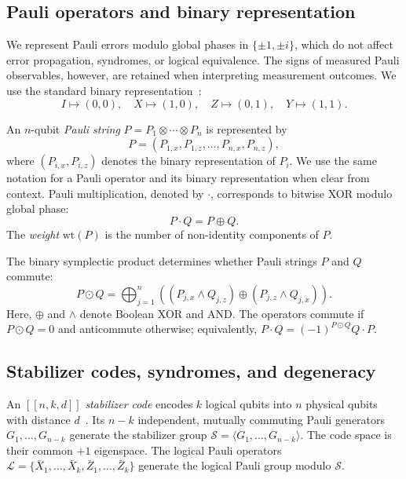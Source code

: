 \documentclass[acmsmall,screen,review,anonymous,nonacm]{acmart}
\begin{document}
\subsection{Pauli operators and binary representation}
\label{subsec:pauli-binary}

We represent Pauli errors modulo global phases in $\{\pm1,\pm i\}$,
which do not affect error propagation, syndromes, or logical equivalence.
The signs of measured Pauli observables, however, are retained when
interpreting measurement outcomes.
We use the standard binary representation~\cite{NC00}:
\begin{equation}
I\mapsto(0,0),\quad X\mapsto(1,0),\quad
Z\mapsto(0,1),\quad Y\mapsto(1,1).
\end{equation}

An $n$-qubit \emph{Pauli string}
$P=P_1\otimes\cdots\otimes P_n$ is represented by
\begin{equation}
P=(P_{1,x},P_{1,z},\ldots,P_{n,x},P_{n,z}),
\label{eq:binary}
\end{equation}
where $(P_{i,x},P_{i,z})$ denotes the binary representation
of $P_i$. We use the same notation for a Pauli operator
and its binary representation when clear from context.
Pauli multiplication, denoted by $\cdot$, corresponds
to bitwise XOR modulo global phase:
\begin{equation}
P\cdot Q=P\oplus Q.
\label{eq:pauli_prod}
\end{equation}
The \emph{weight} $\mathrm{wt}(P)$ is the number of
non-identity components of $P$.

The binary symplectic product determines whether Pauli strings
$P$ and $Q$ commute:
\begin{equation}
P\odot Q=
\bigoplus_{j=1}^{n}
\left(
(P_{j,x}\land Q_{j,z})
\oplus
(P_{j,z}\land Q_{j,x})
\right).
\label{eq:symp_ip}
\end{equation}
Here, $\oplus$ and $\land$ denote Boolean XOR and AND.
The operators commute if $P\odot Q=0$ and
anticommute otherwise; equivalently,
$P\cdot Q=(-1)^{P\odot Q}Q\cdot P$.


\subsection{Stabilizer codes, syndromes, and degeneracy}
\label{subsec:stablizer-syndromes-degeneracy}

An $[[n,k,d]]$ \emph{stabilizer code} encodes $k$ logical
qubits into $n$ physical qubits with distance $d$~\cite{Got97}.
Its $n-k$ independent, mutually commuting Pauli generators
$G_1,\ldots,G_{n-k}$ generate the stabilizer group
$\mathcal{S}=\langle G_1,\ldots,G_{n-k}\rangle$.
The code space is their common $+1$ eigenspace.
The logical Pauli operators
$\mathcal{L}=\{\bar X_1,\ldots,\bar X_k,
\bar Z_1,\ldots,\bar Z_k\}$
generate the logical Pauli group modulo $\mathcal{S}$.
\end{document}
